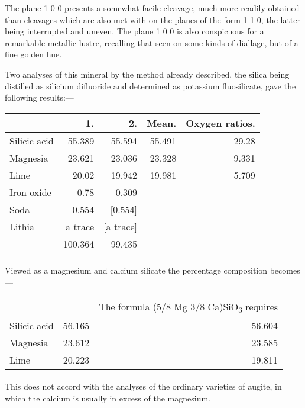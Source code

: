 \documentclass[a4paper, 12pt, oneside]{article}
\begin{document}
The plane 1 0 0 presents a somewhat facile cleavage, much more readily obtained than cleavages which are also met with on the planes of the form 1 1 0, the latter being interrupted and uneven. The plane 1 0 0 is also conspicuous for a remarkable metallic lustre, recalling that seen on some kinds of diallage, but of a fine golden hue.

Two analyses of this mineral by the method already described, the silica being distilled as silicium difluoride and determined as potassium fluosilicate, gave the following results:---
\begin{table}[H]
    \centering
    \footnotesize
    \begin{tabular}{l r r r r}
        ~ & 1. & 2. & Mean. & Oxygen ratios. \\ \hline
        Silicic acid & 55.389 & 55.594 & 55.491 & 29.28 \\
        Magnesia & 23.621 & 23.036 & 23.328 & 9.331 \\
        Lime & 20.02 & 19.942 & 19.981 & 5.709 \\
        Iron oxide & 0.78 & 0.309 & ~ & ~ \\
        Soda & 0.554 & [0.554]   & ~ & ~ \\
        Lithia & a trace & [a trace] & ~ & ~ \\ \hline
        ~ & 100.364 & 99.435 & ~ & ~ \\
    \end{tabular}
\end{table}
\paragraph{}
Viewed as a magnesium and calcium silicate the percentage composition becomes ---
\begin{table}[H]
    \centering
    \footnotesize
    \begin{tabular}{l r r}
        ~ & ~ & The formula (5/8 Mg 3/8 Ca)SiO\textsubscript{3} requires\\
        Silicic acid & 56.165 & 56.604\\
        Magnesia & 23.612 & 23.585\\
        Lime & 20.223 & 19.811\\
    \end{tabular}
\end{table}
\paragraph{}
This does not accord with the analyses of the ordinary varieties of augite, in which the calcium is usually in excess of the magnesium.
\end{document}
